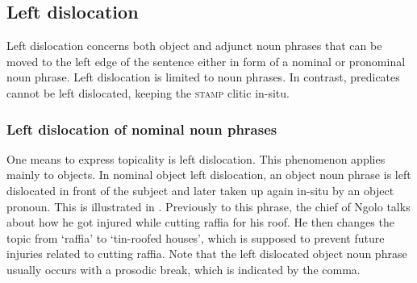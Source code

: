 








\subsection{Left dislocation}
\label{sec:leftdis}

Left dislocation concerns both object and adjunct noun phrases that can be moved to the left edge of the sentence either in form of a nominal or pronominal noun phrase. Left dislocation is limited to noun phrases. In contrast, predicates cannot be left dislocated, keeping the \textsc{stamp} clitic in-situ. 


\subsubsection{Left dislocation of nominal noun phrases}
\label{sec:leftdisN}

One means to express topicality is left dislocation. This phenomenon applies mainly to objects.
In nominal object left dislocation, an object noun phrase is left dislocated in front of the subject and later taken up again in-situ by an object pronoun. This is illustrated in . Previously to this phrase, the chief of Ngolo talks about how he got injured while cutting raffia for his roof. He then changes the topic from `raffia' to `tin-roofed houses', which is supposed to prevent future injuries related to cutting raffia. Note that the left dislocated object noun phrase usually occurs with a prosodic break, which is indicated by the comma.

